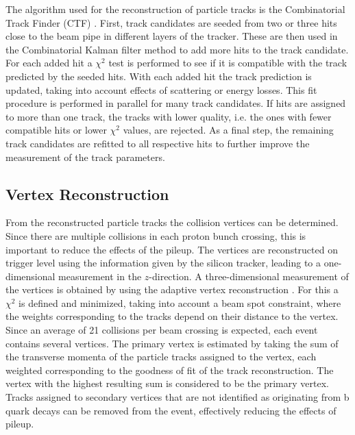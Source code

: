 \noindent The algorithm used for the reconstruction of particle tracks is the Combinatorial Track Finder (CTF) \cite{ctf1,ctf2}. First, track candidates are seeded from two or three hits close to the beam pipe in different layers of the tracker. These are then used in the Combinatorial Kalman filter method \cite{kalman} to add more hits to the track candidate. For each added hit a $\chi^2$ test is performed to see if it is compatible with the track predicted by the seeded hits. With each added hit the track prediction is updated, taking into account effects of scattering or energy losses. This fit procedure is performed in parallel for many track candidates. If hits are assigned to more than one track, the tracks with lower quality, i.e. the ones with fewer compatible hits or lower $\chi^2$ values, are rejected. As a final step, the remaining track candidates are refitted to all respective hits to further improve the measurement of the track parameters.

\subsection{Vertex Reconstruction}
From the reconstructed particle tracks the collision vertices can be determined. Since there are multiple collisions in each proton bunch crossing, this is important to reduce the effects of the pileup. The vertices are reconstructed on trigger level using the information given by the silicon tracker, leading to a one-dimensional measurement in the $z$-direction. A three-dimensional measurement of the vertices is obtained by using the adaptive vertex reconstruction \cite{vertexreco}. For this a $\chi^2$ is defined and minimized, taking into account a beam spot constraint, where the weights corresponding to the tracks depend on their distance to the vertex. Since an average of 21 collisions per beam crossing is expected, each event contains several vertices. The primary vertex is estimated by taking the sum of the transverse momenta of the particle tracks assigned to the vertex, each weighted corresponding to the goodness of fit of the track reconstruction. The vertex with the highest resulting sum is considered to be the primary vertex. Tracks assigned to secondary vertices that are not identified as originating from b quark decays can be removed from the event, effectively reducing the effects of pileup.

